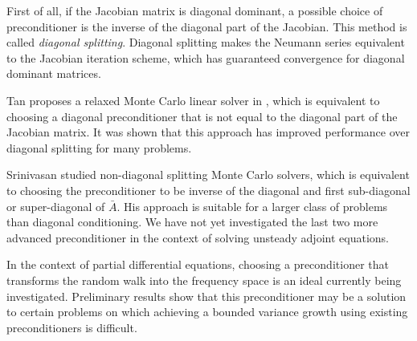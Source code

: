 \documentclass[a4paper,11pt]{article}
\theoremstyle{remark}
\theoremstyle{definition}
\begin{document}
        First of all, if the Jacobian matrix is diagonal dominant, a possible
        choice of preconditioner is the inverse of the diagonal part of the
        Jacobian. This method is called \emph{diagonal splitting}.  Diagonal
        splitting makes the Neumann series equivalent to the Jacobian
        iteration scheme, which has guaranteed convergence for diagonal
        dominant matrices.
        
        Tan proposes a relaxed Monte Carlo linear solver in
        \cite{Tan2001,Tan2002}, which is equivalent to choosing a diagonal
        preconditioner that is not equal to the diagonal part of the Jacobian
        matrix.  It was shown that this approach has improved performance
        over diagonal splitting for many problems.
        
        Srinivasan \cite{Srinivasan2003} studied non-diagonal splitting
        Monte Carlo solvers, which is equivalent to choosing the preconditioner
        to be inverse of the diagonal and first sub-diagonal or super-diagonal
        of $\bar{A}$.  His approach is suitable for a larger class of problems
        than diagonal conditioning.  We have not yet investigated the last two
        more advanced preconditioner in the context of solving unsteady adjoint
        equations.

        In the context of partial differential equations, choosing a
        preconditioner that transforms the random walk into the frequency
        space is an ideal currently being investigated.  Preliminary results
        show that this preconditioner may be a solution to certain problems
        on which achieving a bounded variance growth using existing
        preconditioners is difficult.
    
\end{document}
